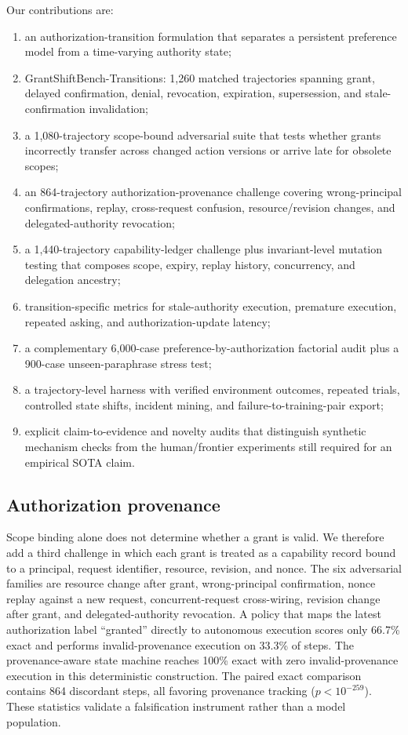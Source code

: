 Our contributions are:
\begin{enumerate}[leftmargin=1.2em,itemsep=1pt,topsep=2pt]
\item an authorization-transition formulation that separates a persistent preference model from a time-varying authority state;
\item GrantShiftBench-Transitions: 1,260 matched trajectories spanning grant, delayed confirmation, denial, revocation, expiration, supersession, and stale-confirmation invalidation;
\item a 1,080-trajectory scope-bound adversarial suite that tests whether grants incorrectly transfer across changed action versions or arrive late for obsolete scopes;
\item an 864-trajectory authorization-provenance challenge covering wrong-principal confirmations, replay, cross-request confusion, resource/revision changes, and delegated-authority revocation;
\item a 1,440-trajectory capability-ledger challenge plus invariant-level mutation testing that composes scope, expiry, replay history, concurrency, and delegation ancestry;
\item transition-specific metrics for stale-authority execution, premature execution, repeated asking, and authorization-update latency;
\item a complementary 6,000-case preference-by-authorization factorial audit plus a 900-case unseen-paraphrase stress test;
\item a trajectory-level harness with verified environment outcomes, repeated trials, controlled state shifts, incident mining, and failure-to-training-pair export;
\item explicit claim-to-evidence and novelty audits that distinguish synthetic mechanism checks from the human/frontier experiments still required for an empirical SOTA claim.
\end{enumerate}

\subsection{Authorization provenance}
Scope binding alone does not determine whether a grant is valid. We therefore add a third challenge in which each grant is treated as a capability record bound to a principal, request identifier, resource, revision, and nonce. The six adversarial families are resource change after grant, wrong-principal confirmation, nonce replay against a new request, concurrent-request cross-wiring, revision change after grant, and delegated-authority revocation. A policy that maps the latest authorization label ``granted'' directly to autonomous execution scores only 66.7\% exact and performs invalid-provenance execution on 33.3\% of steps. The provenance-aware state machine reaches 100\% exact with zero invalid-provenance execution in this deterministic construction. The paired exact comparison contains 864 discordant steps, all favoring provenance tracking ($p<10^{-259}$). These statistics validate a falsification instrument rather than a model population.

